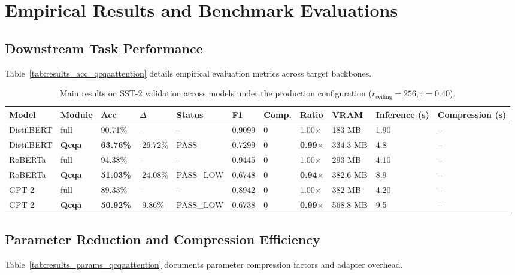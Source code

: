 \section{Empirical Results and Benchmark Evaluations}

\subsection{Downstream Task Performance}
Table~\ref{tab:results_acc_qcqaattention} details empirical evaluation metrics across target backbones.

\begin{table}[t]
\centering
\small
\begin{tabular}{lllllllllll}
\toprule
\textbf{Model} & \textbf{Module} & \textbf{Acc} & \textbf{$\Delta$} & \textbf{Status} & \textbf{F1} & \textbf{Comp.} & \textbf{Ratio} & \textbf{VRAM} & \textbf{Inference (s)} & \textbf{Compression (s)} \\
\midrule
DistilBERT & full & 90.71\% & -- & -- & 0.9099 & 0 & 1.00$\times$ & 183 MB & 1.90 & -- \\
DistilBERT & \textbf{Qcqa} & \textbf{63.76\%} & -26.72\% & PASS & 0.7299 & 0 & \textbf{0.99$\times$} & 334.3 MB & 4.8 & -- \\
RoBERTa & full & 94.38\% & -- & -- & 0.9445 & 0 & 1.00$\times$ & 293 MB & 4.10 & -- \\
RoBERTa & \textbf{Qcqa} & \textbf{51.03\%} & -24.08\% & PASS\_LOW & 0.6748 & 0 & \textbf{0.94$\times$} & 382.6 MB & 8.9 & -- \\
GPT-2 & full & 89.33\% & -- & -- & 0.8942 & 0 & 1.00$\times$ & 382 MB & 4.20 & -- \\
GPT-2 & \textbf{Qcqa} & \textbf{50.92\%} & -9.86\% & PASS\_LOW & 0.6738 & 0 & \textbf{0.99$\times$} & 568.8 MB & 9.5 & -- \\
\bottomrule
\end{tabular}
\caption{Main results on SST-2 validation across models under the production configuration ($r_{\mathrm{ceiling}}=256, \tau=0.40$).}
\label{tab:main_sst2}
\end{table}

\subsection{Parameter Reduction and Compression Efficiency}
Table~\ref{tab:results_params_qcqaattention} documents parameter compression factors and adapter overhead.

